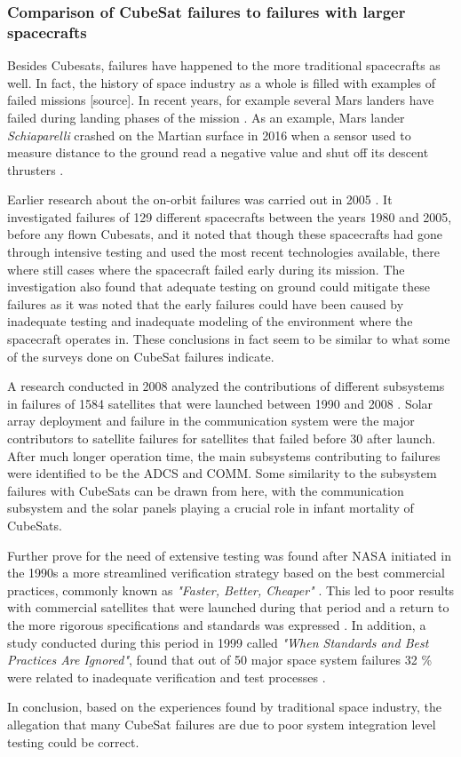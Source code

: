 \documentclass[english,12pt,a4paper,pdftex,elec,utf8]{aaltothesis}
\begin{document}
\subsubsection{Comparison of CubeSat failures to failures with larger spacecrafts}
Besides Cubesats, failures have happened to the more traditional spacecrafts as well. In fact, the history of space industry as a whole is filled with examples of failed missions [source]. In recent years, for example several Mars landers have failed during landing phases of the mission \cite{marsfailures}. As an example, Mars lander \textit{Schiaparelli} crashed on the Martian surface in 2016 when a sensor used to measure distance to the ground read a negative value and shut off its descent thrusters \cite{schiaparelli}.\par
Earlier research about the on-orbit failures was carried out in 2005 \cite{onorbitfailures}. It investigated failures of 129 different spacecrafts between the years 1980 and 2005, before any flown Cubesats, and it noted that though these spacecrafts had gone through intensive testing and used the most recent technologies available, there where still cases where the spacecraft failed early during its mission. The investigation also found that adequate testing on ground could mitigate these failures as it was noted that the early failures could have been caused by inadequate testing and inadequate modeling of the environment where the spacecraft operates in. These conclusions in fact seem to be similar to what some of the surveys done on CubeSat failures indicate. \cite{onorbitfailures} \par
A research conducted in 2008 analyzed the contributions of different subsystems in failures of  1584 satellites that were launched between 1990 and 2008 \cite{satsubsystems}. Solar array deployment and failure in the communication system were the major contributors to satellite failures for satellites that failed before 30 after launch. After much longer operation time, the main subsystems contributing to failures were identified to be the ADCS and COMM. Some similarity to the subsystem failures with CubeSats can be drawn from here, with the communication subsystem and the solar panels playing a crucial role in infant mortality of CubeSats.\par 
Further prove for the need of extensive testing was found after NASA initiated in the 1990s a more streamlined verification strategy based on the best commercial practices, commonly known as \textit{"Faster, Better, Cheaper"} \cite{satverplanning}. This led to poor results with commercial satellites that were launched during that period and a return to the more rigorous specifications and standards was expressed \cite{satverplanning}. In addition, a study conducted during this period in 1999 called \textit{"When Standards and Best Practices Are Ignored"}, found that out of 50 major space system failures 32 \% were related to inadequate verification and test processes \cite{whenstandignored}.\par 
In conclusion, based on the experiences found by traditional space industry, the allegation that many CubeSat failures are due to poor system integration level testing could be correct.\par 
\end{document}
